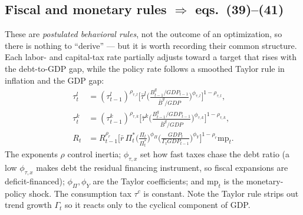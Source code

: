 \subsection{Fiscal and monetary rules \texorpdfstring{$\Rightarrow$}{=>} eqs.\ (39)--(41)}
These are \emph{postulated behavioral rules}, not the outcome of an optimization, so there is nothing
to ``derive'' --- but it is worth recording their common structure. Each labor- and capital-tax rate
partially adjusts toward a target that rises with the debt-to-GDP gap, while the policy rate follows a
smoothed Taylor rule in inflation and the GDP gap:
\begin{align}
\tau^l_t&=(\tau^l_{t-1})^{\rho_{\tau,l}}\Big[\bar\tau^l\big(\tfrac{B^g_{t-1}/GDP_{t-1}}{\bar B^g/GDP}\big)^{\phi_{\tau,l}}\Big]^{1-\rho_{\tau,l}},\tag{P-39}\\
\tau^k_t&=(\tau^k_{t-1})^{\rho_{\tau,k}}\Big[\bar\tau^k\big(\tfrac{B^g_{t-1}/GDP_{t-1}}{\bar B^g/GDP}\big)^{\phi_{\tau,k}}\Big]^{1-\rho_{\tau,k}},\tag{P-40}\\
R_t&=R_{t-1}^{\rho_r}\Big[\bar r\,\Pi^*_t\big(\tfrac{\Pi_t}{\Pi^*_t}\big)^{\phi_\Pi}\big(\tfrac{GDP_t}{\Gamma_tGDP_{t-1}}\big)^{\phi_Y}\Big]^{1-\rho_r}\mathrm{mp}_t.\tag{P-41}
\end{align}
The exponents $\rho$ control inertia; $\phi_{\tau,x}$ set how fast taxes chase the debt ratio (a low
$\phi_{\tau,x}$ makes debt the residual financing instrument, so fiscal expansions are deficit-financed);
$\phi_\Pi,\phi_Y$ are the Taylor coefficients; and $\mathrm{mp}_t$ is the monetary-policy shock. The
consumption tax $\tau^c$ is constant. Note the Taylor rule strips out trend growth $\Gamma_t$ so it
reacts only to the cyclical component of GDP.

